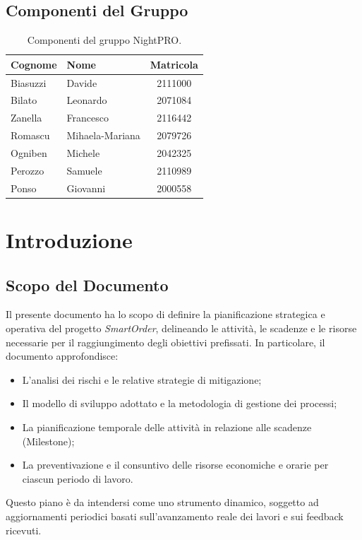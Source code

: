 \documentclass[a4paper, 11pt, oneside]{scrartcl} %
\begin{document}
\subsection*{Componenti del Gruppo}

\begin{table}[h!]
\centering
\renewcommand{\arraystretch}{1.2} 
\begin{tabular}{@{}llc@{}}
\toprule
\textbf{Cognome} & \textbf{Nome} & \textbf{Matricola} \\
\midrule
Biasuzzi & Davide & 2111000 \\
Bilato & Leonardo & 2071084 \\
Zanella & Francesco & 2116442 \\
Romascu & Mihaela-Mariana & 2079726 \\
Ogniben & Michele & 2042325 \\
Perozzo & Samuele & 2110989 \\
Ponso & Giovanni & 2000558 \\
\bottomrule
\end{tabular}
\caption{Componenti del gruppo NightPRO.}
\end{table}

\newpage
\section{Introduzione}

\subsection{Scopo del Documento}
Il presente documento ha lo scopo di definire la pianificazione strategica e operativa del progetto \textit{SmartOrder}, delineando le attività, le scadenze e le risorse necessarie per il raggiungimento degli obiettivi prefissati. 
In particolare, il documento approfondisce:
\begin{itemize}
    \item L'analisi dei rischi e le relative strategie di mitigazione{\scriptsize{}};
    \item Il modello di sviluppo adottato{\scriptsize{}} e la metodologia di gestione dei processi;
    \item La pianificazione temporale delle attività in relazione alle scadenze (Milestone{\scriptsize{}});
    \item La preventivazione e il consuntivo{\scriptsize{}} delle risorse economiche e orarie per ciascun periodo di lavoro.
\end{itemize}
Questo piano è da intendersi come uno strumento dinamico, soggetto ad aggiornamenti periodici basati sull'avanzamento reale dei lavori e sui feedback ricevuti.
\end{document}
